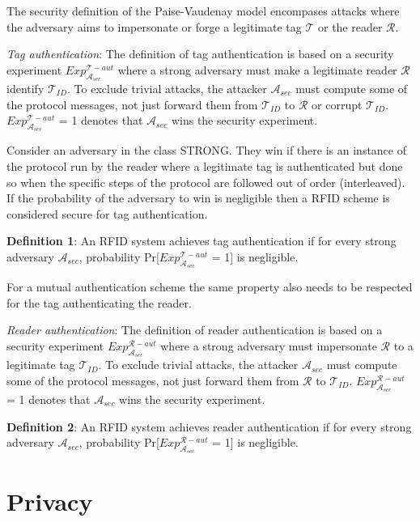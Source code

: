     The security definition of the Paise-Vaudenay model \cite{PV model} encompases attacks where the adversary aims to impersonate or 
    forge a legitimate tag $\mathcal{T}$ or the reader $\mathcal{R}$.

    \textit{Tag authentication}: The definition of tag authentication is based on a security experiment $Exp_{\mathcal{A}_{sec}}^{\mathcal{T}-aut}$
    where a strong adversary must make a legitimate reader $\mathcal{R}$ identify $\mathcal{T}_{ID}$. To exclude trivial attacks, the attacker $\mathcal{A}_{sec}$
    must compute some of the protocol messages, not just forward them from $\mathcal{T}_{ID}$ to $\mathcal{R}$ or corrupt $\mathcal{T}_{ID}$. $Exp_{\mathcal{A}_{sec}}^{\mathcal{T}-aut}$ = 1
    denotes that $\mathcal{A}_{sec}$ wins the security experiment.

    Consider an adversary in the class STRONG. They win if there is an instance of the protocol run
    by the reader where a legitimate tag is authenticated but done so when the specific steps of the 
    protocol are followed out of order (interleaved). If the probability of the adversary to win is 
    negligible then a RFID scheme is considered secure for tag authentication.

    \textbf{Definition 1}: An RFID system achieves tag authentication if for every strong adversary $\mathcal{A}_{sec}$, probability 
    Pr[$Exp_{\mathcal{A}_{sec}}^{\mathcal{T}-aut}$ = 1] is negligible.

    For a mutual authentication scheme the same property also needs to be respected for the tag authenticating
    the reader.

    \textit{Reader authentication}: The definition of reader authentication is based on a security experiment $Exp_{\mathcal{A}_{sec}}^{\mathcal{R}-aut}$
    where a strong adversary must impersonate $\mathcal{R}$ to a legitimate tag $\mathcal{T}_{ID}$. To exclude trivial attacks, the attacker $\mathcal{A}_{sec}$
    must compute some of the protocol messages, not just forward them from $\mathcal{R}$ to $\mathcal{T}_{ID}$. $Exp_{\mathcal{A}_{sec}}^{\mathcal{R}-aut}$ = 1
    denotes that $\mathcal{A}_{sec}$ wins the security experiment.

    \textbf{Definition 2}: An RFID system achieves reader authentication if for every strong adversary $\mathcal{A}_{sec}$, probability 
    Pr[$Exp_{\mathcal{A}_{sec}}^{\mathcal{R}-aut}$ = 1] is negligible.

    \section{Privacy}

